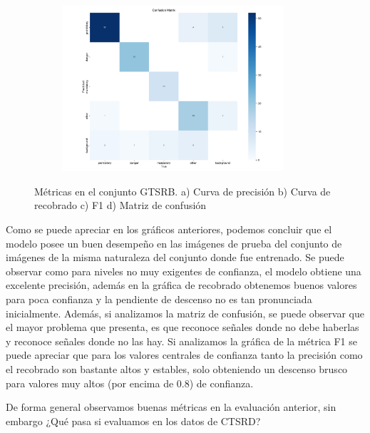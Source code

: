 \documentclass{article}
\begin{document}
\begin{figure}[h]
\begin{subfigure}[b]{0.5\textwidth}
\caption{}
\end{subfigure}
\begin{subfigure}[b]{0.5\textwidth}
\centering
\includegraphics[width=0.9\textwidth]{resources/general in general confusion matrix.png}
\caption{}
\end{subfigure}
\caption{Métricas en el conjunto GTSRB. a) Curva de precisión b) Curva de recobrado c) F1 d) Matriz de confusión}
\label{fig:results in general}
\end{figure}

Como se puede apreciar en los gráficos anteriores, podemos concluir que el modelo posee un buen desempeño en las imágenes de prueba del conjunto de imágenes de la misma naturaleza del conjunto donde fue entrenado. Se puede observar como para niveles no muy exigentes de confianza, el modelo obtiene una excelente precisión, además en la gráfica de recobrado obtenemos buenos valores para poca confianza y la pendiente de descenso no es tan pronunciada inicialmente. Además, si analizamos la matriz de confusión, se puede observar que el mayor problema que presenta, es que reconoce señales donde no debe haberlas y reconoce señales donde no las hay. Si analizamos la gráfica de la métrica F1 se puede apreciar que para los valores centrales de confianza tanto la precisión como el recobrado son bastante altos y estables, solo obteniendo un descenso brusco para valores muy altos (por encima de 0.8) de confianza.

De forma general observamos buenas métricas en la evaluación anterior, sin embargo ¿Qué pasa si evaluamos en los datos de CTSRD?
\end{document}

